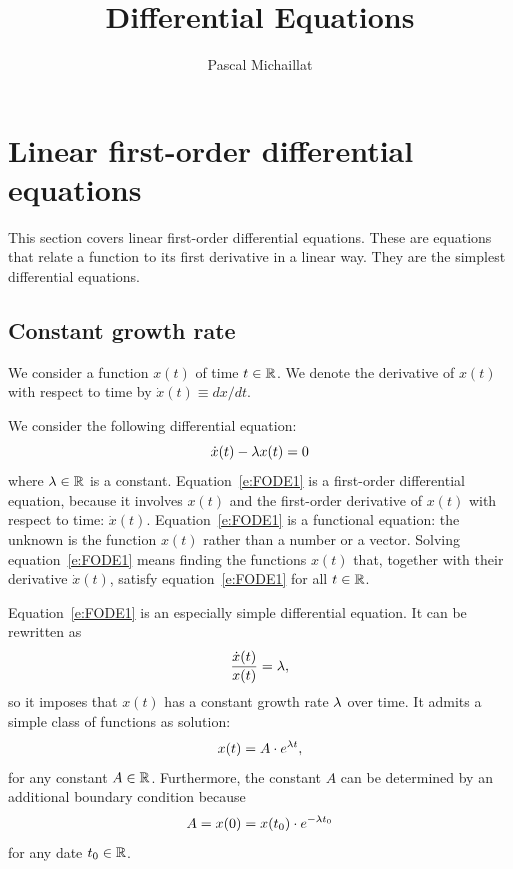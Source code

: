 \documentclass[letterpaper, 11pt, leqno]{article}
\begin{document}
\title{Differential Equations}
\author{Pascal Michaillat}
\date{}
\begin{titlepage}
\maketitle
\tableofcontents
\end{titlepage}

\section{Linear first-order differential equations}\label{s:one}

This section covers linear first-order differential equations. These are equations that relate a function to its first derivative in a linear way. They are the simplest differential equations.

\subsection{Constant growth rate}

We consider a function $x(t)$ of time $t\in\mathbb{R}$. We denote the derivative of $x(t)$ with respect to time by $\dot{x}(t)\equiv dx/dt$.

We consider the following differential equation:
\begin{equation}
\dot{x}(t) -\lambda x(t) = 0
\label{e:FODE1}\end{equation}
where $\lambda\in\mathbb{R}$ is a constant. Equation~\eqref{e:FODE1} is a first-order differential equation, because it involves $x(t)$ and the first-order derivative of $x(t)$ with respect to time: $\dot{x}(t)$. Equation~\eqref{e:FODE1} is a functional equation: the unknown is the function $x(t)$ rather than a number or a vector. Solving equation~\eqref{e:FODE1} means finding the functions $x(t)$ that, together with their derivative $\dot{x}(t)$, satisfy equation~\eqref{e:FODE1} for all $t \in \mathbb{R}$.

Equation~\eqref{e:FODE1} is an especially simple differential equation. It can be rewritten as 
\begin{equation*}
\frac{\dot{x}(t)}{x(t)}= \lambda,
\end{equation*}
so it imposes that $x(t)$ has a constant growth rate $\lambda$ over time. It admits a simple class of functions as solution:
\begin{equation}
x(t) =A\cdot e^{\lambda t},
\label{e:FODE1sol}\end{equation}
for any constant $A\in \mathbb{R}$. Furthermore, the constant $A$ can be determined by an additional boundary condition because
\begin{equation*}
A=x(0)=x(t_{0})\cdot e^{-\lambda t_{0}}
\end{equation*}
for any date $t_{0}\in \mathbb{R}$.
\end{document}
